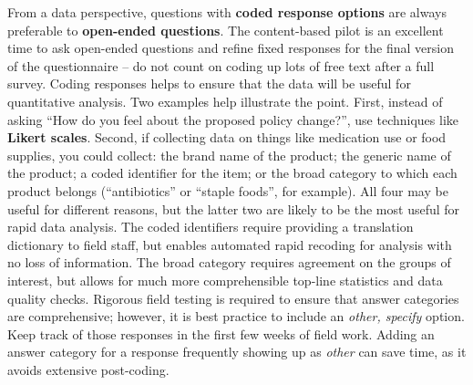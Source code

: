 From a data perspective, questions with \textbf{coded response options}
are always preferable to \textbf{open-ended questions}.
The content-based pilot is an excellent time to ask open-ended questions
and refine fixed responses for the final version of the questionnaire --
do not count on coding up lots of free text after a full survey.
Coding responses helps to ensure that the data
will be useful for quantitative analysis.
Two examples help illustrate the point.
First, instead of asking ``How do you feel about the proposed policy change?'',
use techniques like \textbf{Likert scales}.
Second, if collecting data on things like medication use or food supplies, you could collect:
the brand name of the product; the generic name of the product; a coded identifier for the item;
or the broad category to which each product belongs
(``antibiotics'' or ``staple foods'', for example).
All four may be useful for different reasons,
but the latter two are likely to be the most useful for rapid data analysis.
The coded identifiers require providing a translation dictionary to field staff,
but enables automated rapid recoding for analysis with no loss of information.
The broad category requires agreement on the groups of interest,
but allows for much more comprehensible top-line statistics and data quality checks.
Rigorous field testing is required to ensure that answer categories are comprehensive;
however, it is best practice to include an \textit{other, specify} option.
Keep track of those responses in the first few weeks of field work.
Adding an answer category for a response frequently showing up as \textit{other} can save time,
as it avoids extensive post-coding.

